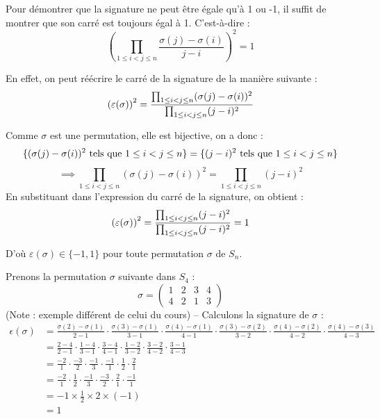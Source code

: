 \documentclass[12pt, a4paper]{report}
\begin{document}
Pour démontrer que la signature ne peut être égale qu'à 1 ou -1, il suffit de montrer que son carré est toujours égal à 1. C'est-à-dire :
$$\left(\prod_{1 \le i < j \le n} \frac{\sigma(j) - \sigma(i)}{j - i}\right)^2 = 1$$

En effet, on peut réécrire le carré de la signature de la manière suivante :
$$\left(\varepsilon(\sigma)\right)^2 = \frac{\prod_{1 \le i < j \le n} (\sigma(j) - \sigma(i))^2}{\prod_{1 \le i < j \le n} (j - i)^2}$$

Comme $\sigma$ est une permutation, elle est bijective, on a donc :
$$\{(\sigma(j) - \sigma(i))^2 \text{ tels que } 1 \le i < j \le n\} = \{(j - i)^2 \text{ tels que } 1 \le i < j \le n\}$$
$$\implies \prod_{1 \le i < j \le n} (\sigma(j) - \sigma(i))^2 = \prod_{1 \le i < j \le n} (j - i)^2$$
En substituant dans l'expression du carré de la signature, on obtient :
$$\left(\varepsilon(\sigma)\right)^2 = \frac{\prod_{1 \le i < j \le n} (j - i)^2}{\prod_{1 \le i < j \le n} (j - i)^2} = 1$$

D'où $\varepsilon(\sigma) \in \{-1, 1\}$ pour toute permutation $\sigma$ de $S_n$.

\begin{example}
    Prenons la permutation $\sigma$ suivante dans $S_4$ :
    $$\sigma = \left(\begin{matrix} 1 & 2 & 3 & 4 \\ 4 & 2 & 1 & 3 \end{matrix}\right)$$
    (Note : exemple différent de celui du cours) -- Calculons la signature de $\sigma$ :
    \begin{align*}
        \epsilon(\sigma) &= \frac{\sigma(2) - \sigma(1)}{2 - 1} \cdot \frac{\sigma(3) - \sigma(1)}{3 - 1} \cdot \frac{\sigma(4) - \sigma(1)}{4 - 1} \cdot \frac{\sigma(3) - \sigma(2)}{3 - 2} \cdot \frac{\sigma(4) - \sigma(2)}{4 - 2} \cdot \frac{\sigma(4) - \sigma(3)}{4 - 3} \\
        &= \frac{2 - 4}{2 - 1} \cdot \frac{1 - 4}{3 - 1} \cdot \frac{3 - 4}{4 - 1} \cdot \frac{1 - 2}{3 - 2} \cdot \frac{3 - 2}{4 - 2} \cdot \frac{3 - 1}{4 - 3} \\
        &= \frac{-2}{1} \cdot \frac{-3}{2} \cdot \frac{-1}{3} \cdot \frac{-1}{1} \cdot \frac{1}{2} \cdot \frac{2}{1} \\
        &= \frac{-2}{1} \cdot \frac{1}{2} \cdot \frac{-1}{3} \cdot \frac{-3}{2} \cdot \frac{2}{1} \cdot \frac{-1}{1} \\
        &= -1 \times \frac12 \times 2 \times (-1)\\
        &= 1
    \end{align*}
\end{example}
\end{document}
